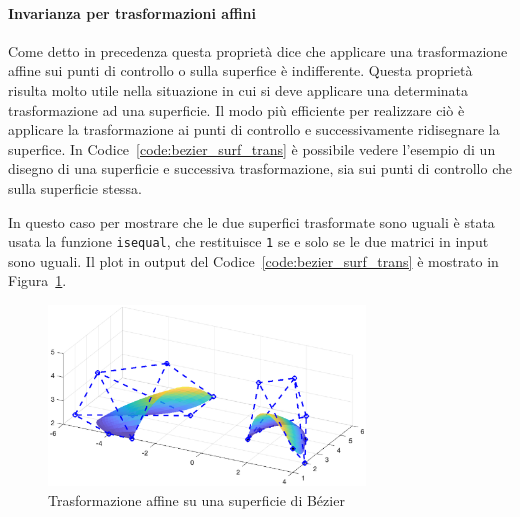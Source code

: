 \documentclass[a4paper, 12pt]{article}
\begin{document}
  \paragraph{Invarianza per trasformazioni affini}
  Come detto in precedenza questa proprietà dice che applicare una trasformazione affine sui punti di controllo o sulla superfice è indifferente. 
  Questa proprietà risulta molto utile nella situazione in cui si deve applicare una determinata trasformazione ad una superficie. Il modo 
  più efficiente per realizzare ciò è applicare la trasformazione ai punti di controllo e successivamente ridisegnare la superfice.
  In Codice~\ref{code:bezier_surf_trans} è possibile vedere l'esempio di un disegno di una superficie e successiva trasformazione,
  sia sui punti di controllo che sulla superficie stessa.
  
  In questo caso per mostrare che le due superfici trasformate sono uguali è stata usata la funzione \texttt{isequal}, che restituisce \texttt{1} se e solo se 
  le due matrici in input sono uguali. Il plot in output del Codice~\ref{code:bezier_surf_trans} è mostrato in Figura~\ref{fig:bezier_surf_trans}.
  \begin{figure}[]
    \centering
    \includegraphics[width=0.75\textwidth]{figure/bezier_surf_trans.eps}
    \caption{Trasformazione affine su una superficie di Bézier}
    \label{fig:bezier_surf_trans}
  \end{figure} 
\end{document}
